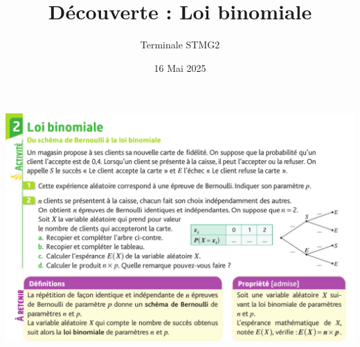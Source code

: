 \documentclass{article}
\title{Découverte : Loi binomiale}
\date{16 Mai 2025}
\author{Terminale STMG2}
\begin{document}
\maketitle
\begin{center}
\includegraphics[width=\textwidth]{Decouverte_loi_binomiale.png}
\end{center}
\end{document}
